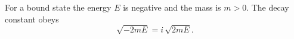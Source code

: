\documentclass{article}
\begin{document}
For a bound state the energy $E$ is negative and the mass is $m>0$. The decay constant obeys
\begin{equation}
\sqrt{-2 m E} = i\,\sqrt{2 m E} .
\label{eq:kappa}
\end{equation}
\end{document}
